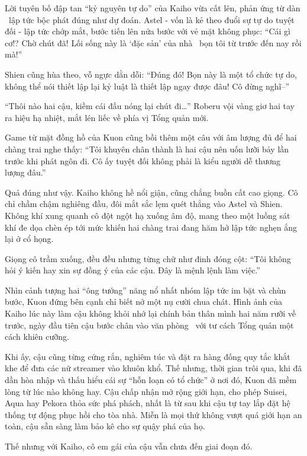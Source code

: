\documentclass[../main.tex]{subfiles}
\begin{document}
Lời tuyên bố đập tan ``kỷ nguyên tự do'' của Kaiho vừa cất lên, phản ứng từ dàn \hls\ lập tức bộc phát đúng như dự đoán. Astel - vốn là kẻ theo đuổi sự tự do tuyệt đối - lập tức chớp mắt, bước tiến lên nửa bước với vẻ mặt không phục: ``Cái gì cơ!? Chờ chút đã! Lối sống này là `đặc sản' của nhà \hls\ bọn tôi từ trước đến nay rồi mà!''

Shien cũng hùa theo, vỗ ngực dằn dỗi: ``Đúng đó! Bọn này là một tổ chức tự do, không thể nói thiết lập lại kỷ luật là thiết lập ngay được đâu! Cô đừng nghĩ--''

``Thôi nào hai cậu, kiềm cái đầu nóng lại chút đi\dots'' Roberu vội vàng giơ hai tay ra hiệu hạ nhiệt, mắt lén liếc về phía vị Tổng quản mới.

Game từ mặt đồng hồ của Kuon cũng bồi thêm một câu với âm lượng đủ để hai chàng trai nghe thấy: ``Tôi khuyên chân thành là hai cậu nên uốn lưỡi bảy lần trước khi phát ngôn đi. Cô ấy tuyệt đối không phải là kiểu người dễ thương lượng đâu.''

Quả đúng như vậy. Kaiho không hề nổi giận, cũng chẳng buồn cất cao giọng. Cô chỉ chầm chậm nghiêng đầu, đôi mắt sắc lẹm quét thẳng vào Astel và Shien. Không khí xung quanh cô đột ngột hạ xuống âm độ, mang theo một luồng sát khí đe dọa chèn ép tới mức khiến hai chàng trai đang hăm hở lập tức nghẹn ắng lại ở cổ họng.

Giọng cô trầm xuống, đều đều nhưng từng chữ như đinh đóng cột: ``Tôi không hỏi ý kiến hay xin sự đồng ý của các cậu. Đây là mệnh lệnh làm việc.''

Nhìn cảnh tượng hai ``ông tướng'' năng nổ nhất nhóm lập tức im bặt và chùn bước, Kuon đứng bên cạnh chỉ biết nở một nụ cười chua chát. Hình ảnh của Kaiho lúc này làm cậu không khỏi nhớ lại chính bản thân mình hai năm rưỡi về trước, ngày đầu tiên cậu bước chân vào văn phòng \hll\ với tư cách Tổng quản một cách khiên cưỡng.

Khi ấy, cậu cũng từng cứng rắn, nghiêm túc và đặt ra hàng đống quy tắc khắt khe để đưa các nữ streamer vào khuôn khổ. Thế nhưng, thời gian trôi qua, khi đã dần hòa nhập và thấu hiểu cái sự ``hỗn loạn có tổ chức'' ở nơi đó, Kuon đã mềm lòng từ lúc nào không hay. Cậu chấp nhận mở rộng giới hạn, cho phép Suisei, Aqua hay Pekora thỏa sức phá phách, nhất là từ sau khi cậu tự tay lắp đặt hệ thống tự động phục hồi cho tòa nhà. Miễn là mọi thứ không vượt quá giới hạn an toàn, cậu sẵn sàng làm bảo kê cho sự quậy phá của họ.

Thế nhưng với Kaiho, cô em gái của cậu vẫn chưa đến giai đoạn đó.
\end{document}
